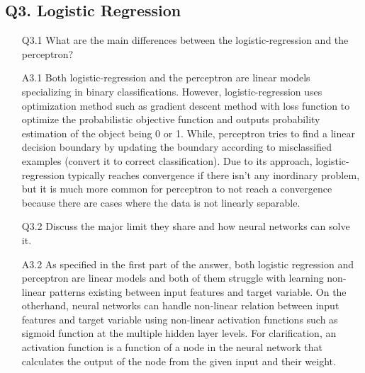 \documentclass[11pt]{scrartcl}
\begin{document}
\subsection*{Q3. Logistic Regression}
\begin{itemize}
\item[Q3.1] What are the main differences between the logistic-regression and the perceptron?
\item[A3.1] Both logistic-regression and the perceptron are linear models specializing in binary classifications. However, logistic-regression uses optimization method such as gradient descent method with loss function to optimize the probabilistic objective function and outputs probability estimation of the object being 0 or 1. While, perceptron tries to find a linear decision boundary by updating the boundary according to misclassified examples (convert it to correct classification). Due to its approach, logistic-regression typically reaches convergence if there isn't any inordinary problem, but it is much more common for perceptron to not reach a convergence because there are cases where the data is not linearly separable. \\

\item[Q3.2] Discuss the major limit they share and how neural networks can solve it.
\item[A3.2] As specified in the first part of the answer, both logistic regression and perceptron are linear models and both of them struggle with learning non-linear patterns existing between input features and target variable. On the otherhand, neural networks can handle non-linear relation between input features and target variable using non-linear activation functions such as sigmoid function at the multiple hidden layer levels. For clarification, an activation function is a function of a node in the neural network that calculates the output of the node from the given input and their weight.\\


\end{itemize}
\end{document}
